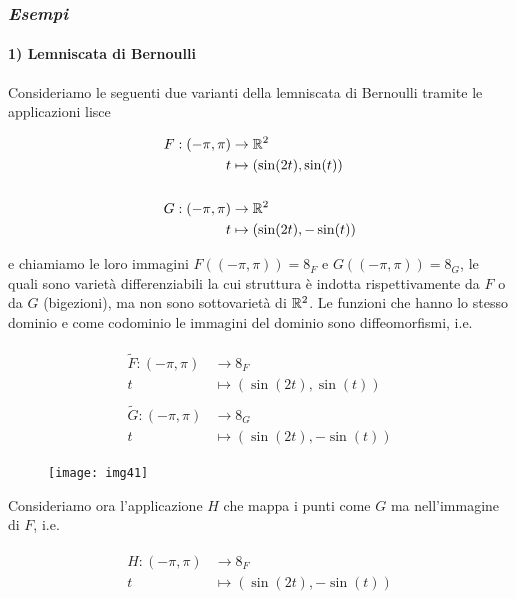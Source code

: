 \subsubsection{\textit{Esempi}}

\paragraph{1) Lemniscata di Bernoulli}

Consideriamo le seguenti due varianti della lemniscata di Bernoulli tramite le applicazioni lisce

\begin{align}
	\begin{split}
		F : (-\pi,\pi) &\to \mathbb{R}^{2}\\
		t &\mapsto (\sin(2t),\sin(t))\\\\
		G : (-\pi,\pi) &\to \mathbb{R}^{2}\\
		t &\mapsto (\sin(2t),-\sin(t))
	\end{split}
\end{align}

e chiamiamo le loro immagini $ F((-\pi,\pi)) = \mathfrak{8}_{F} $ e $ G((-\pi,\pi)) = \mathfrak{8}_{G} $, le quali sono varietà differenziabili la cui struttura è indotta rispettivamente da $ F $ o da $ G $ (bigezioni), ma non sono sottovarietà di $ \mathbb{R}^{2} $. Le funzioni che hanno lo stesso dominio e come codominio le immagini del dominio sono diffeomorfismi, i.e.

\begin{align}
	\begin{split}
		\tilde{F} : (-\pi,\pi) &\to \mathfrak{8}_{F}\\
		t &\mapsto (\sin(2t),\sin(t))\\\\
		\tilde{G} : (-\pi,\pi) &\to \mathfrak{8}_{G}\\
		t &\mapsto (\sin(2t),-\sin(t))
	\end{split}
\end{align}

\begin{figure}[H]
	\centering
	\texttt{[image: img41]}
\end{figure}

Consideriamo ora l'applicazione $ H $ che mappa i punti come $ G $ ma nell'immagine di $ F $, i.e.

\begin{align}
	\begin{split}
		H : (-\pi,\pi) &\to \mathfrak{8}_{F}\\
		t &\mapsto (\sin(2t),-\sin(t))
	\end{split}
\end{align}

